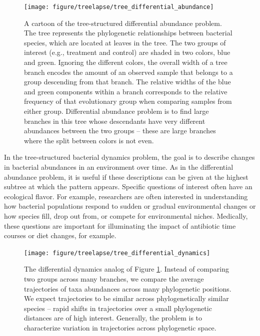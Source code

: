 \begin{figure}
  \centering
  \texttt{[image: figure/treelapse/tree\_differential\_abundance]}
  \caption{A cartoon of the tree-structured differential abundance problem. The
    tree represents the phylogenetic relationships between bacterial species,
    which are located at leaves in the tree. The two groups of interest (e.g.,
    treatment and control) are shaded in two colors, blue and green. Ignoring
    the different colors, the overall width of a tree branch encodes the amount
    of an observed sample that belongs to a group descending from that branch.
    The relative widths of the blue and green components within a branch
    corresponds to the relative frequency of that evolutionary group when
    comparing samples from either group. Differential abundance problem is to
    find large branches in this tree whose descendants have very different
    abundances between the two groups -- these are large branches where the
    split between colors is not even.
    \label{fig:tree_differential_abundance} }
\end{figure}

In the tree-structured bacterial dynamics problem, the goal is to describe
changes in bacterial abundances in an environment over time. As in the
differential abundance problem, it is useful if these descriptions can be given
at the highest subtree at which the pattern appears. Specific questions of
interest often have an ecological flavor. For example, researchers are often
interested in understanding how bacterial populations respond to sudden or
gradual environmental changes or how species fill, drop out from, or compete for
environmental niches. Medically, these questions are important for illuminating
the impact of antibiotic time courses or diet changes, for example.

\begin{figure}
  \centering
  \texttt{[image: figure/treelapse/tree\_differential\_dynamics]}
  \caption{
    The differential dynamics analog of Figure
    \ref{fig:tree_differential_abundance}. Instead of comparing two groups
    across many branches, we compare the average trajectories of taxa abundances
    across many phylogenetic positions. We expect trajectories to be similar
    across phylogenetically similar species -- rapid shifts in trajectories over
    a small phylogenetic distances are of high interest. Generally, the problem
    is to characterize variation in trajectories across phylogenetic space.
    \label{fig:tree_differential_dynamics}}
\end{figure}


